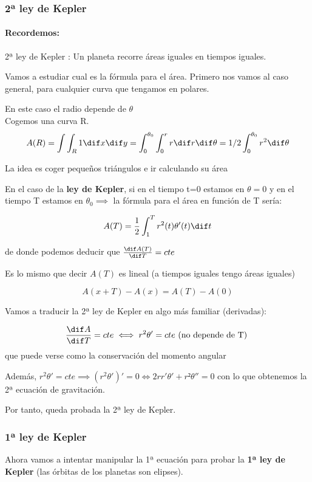 \subsubsection{2ª ley de Kepler}
\paragraph{Recordemos:}
2ª ley de Kepler : Un planeta recorre áreas iguales en tiempos iguales.

Vamos a estudiar cual es la fórmula para el área.
Primero nos vamos al caso general, para cualquier curva que tengamos en polares.

En este caso el radio depende de $\theta$ \\
Cogemos una curva R.\\

$$A(R) = \int\int_R 1 \dif x \dif y = \int_0^{\theta_0} \int_0^r r \dif r \dif \theta = 1/2 \int_0^{\theta_0} r^2\dif\theta$$

La idea es coger pequeños triángulos e ir calculando su área

En el caso de la \textbf{ley de Kepler}, si en el tiempo t=0 estamos en $\theta = 0$ y en el tiempo T estamos en $\theta_0 \implies$ la fórmula para el área en función de T sería:

$$A(T) = \frac{1}{2} \int_1^T r^2(t) \theta'(t) \dif t$$


de donde podemos deducir que $\frac {\dif A(T)}{\dif T} = cte$

Es lo mismo que decir $A(T)$ es lineal (a tiempos iguales tengo áreas iguales)

\[A(x + T) - A(x) = A(T) - A(0)\]

Vamos a traducir la 2ª ley de Kepler en algo más familiar (derivadas):

\[\frac{\dif A}{\dif T} = cte \iff r^2\theta' = cte  \text{ (no depende de T) }\]
que puede verse como la conservación del momento angular

Además, $r^2\theta' = cte  \implies (r^2\theta')' = 0 \iff 2rr'\theta' + r²\theta'' =0$ con lo que obtenemos la 2ª ecuación de gravitación.

Por tanto, queda probada la 2ª ley de Kepler.

\subsubsection{1ª ley de Kepler}
Ahora vamos a intentar manipular la 1ª ecuación para probar la \textbf{1ª ley de Kepler} (las órbitas de los planetas son elipses).

